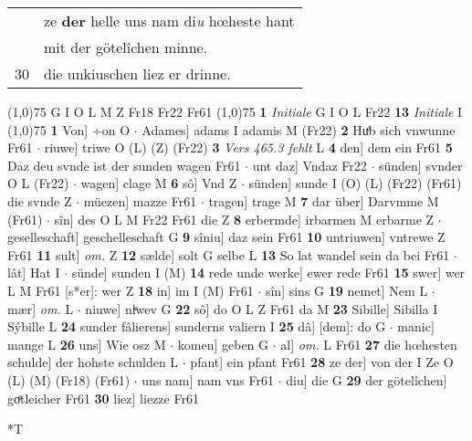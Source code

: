 \documentclass[8pt,a4paper,notitlepage]{article}
\begin{document}
\begin{table}[ht]
\begin{minipage}[t]{0.5\linewidth}
\begin{tabular}{rl}
 & ze \textbf{der} helle uns nam di\textit{u} hœheste hant\\ 
 & mit der götelîchen minne.\\ 
30 & die unkiuschen liez er drinne.\\ 
\end{tabular}
\scriptsize
\line(1,0){75} \newline
G I O L M Z Fr18 Fr22 Fr61 \newline
\line(1,0){75} \newline
\textbf{1} \textit{Initiale} G I O L Fr22  \textbf{13} \textit{Initiale} I  \newline
\line(1,0){75} \newline
\textbf{1} Von] ÷on O  $\cdot$ Adames] adams I adamis M (Fr22) \textbf{2} Huͤb sich vnwunne Fr61  $\cdot$ riuwe] triwe O (L) (Z) (Fr22) \textbf{3} \textit{Vers 465.3 fehlt} L  \textbf{4} den] dem ein Fr61 \textbf{5} Daz deu svnde ist der sunden wagen Fr61  $\cdot$ unt daz] Vndaz Fr22  $\cdot$ sünden] svnder O L (Fr22)  $\cdot$ wagen] clage M \textbf{6} sô] Vnd Z  $\cdot$ sünden] sunde I (O) (L) (Fr22) (Fr61) die svnde Z  $\cdot$ müezen] mazze Fr61  $\cdot$ tragen] trage M \textbf{7} dar über] Darvmme M (Fr61)  $\cdot$ sîn] des O L M Fr22 Fr61 die Z \textbf{8} erbermde] irbarmen M erbarme Z  $\cdot$ geselleschaft] geschelleschaft G \textbf{9} sîniu] daz sein Fr61 \textbf{10} untriuwen] vntrewe Z Fr61 \textbf{11} sult] \textit{om.} Z \textbf{12} sælde] solt G selbe L \textbf{13} So lat wandel sein da bei Fr61  $\cdot$ lât] Hat I  $\cdot$ sünde] sunden I (M) \textbf{14} rede unde werke] ewer rede Fr61 \textbf{15} swer] wer L M Fr61 [s*er]: wer Z \textbf{18} in] im I (M) Fr61  $\cdot$ sîn] sins G \textbf{19} nemet] Nem L  $\cdot$ mær] \textit{om.} L  $\cdot$ niuwe] niͮwev G \textbf{22} sô] do O L Z Fr61 da M \textbf{23} Sibille] Sibilla I Sýbille L \textbf{24} sunder fâlierens] sunderns valiern I \textbf{25} dâ] [dem]: do G  $\cdot$ manic] mange L \textbf{26} uns] Wie osz M  $\cdot$ komen] geben G  $\cdot$ al] \textit{om.} L Fr61 \textbf{27} die hœhesten schulde] der hohste schulden L  $\cdot$ pfant] ein pfant Fr61 \textbf{28} ze der] von der I Ze O (L) (M) (Fr18) (Fr61)  $\cdot$ uns nam] nam vns Fr61  $\cdot$ diu] die G \textbf{29} der götelîchen] goͤtleicher Fr61 \textbf{30} liez] liezze Fr61 \newline
\end{minipage}
\hspace{0.5cm}
\begin{minipage}[t]{0.5\linewidth}
\small
\begin{center}*T

\end{center}
\end{minipage}
\end{table}
\end{document}

